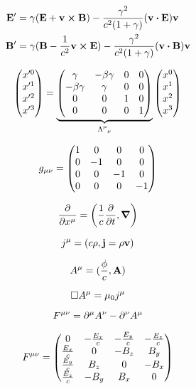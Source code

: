 \documentclass[11pt,twoside]{article}
\begin{document}
\begin{multicols}{3}
\begin{footnotesize}
\begin{equation}
\begin{split}
\vb{E'} &= \gamma(\vb{E} + \vb{v}\cross\vb{B}) - \frac{\gamma^2}{c^2(1+\gamma)}(\vb{v}\vdot\vb{E})\vb{v} \\
\vb{B'} &= \gamma(\vb{B} - \frac{1}{c^2}\vb{v}\cross\vb{E}) - \frac{\gamma^2}{c^2(1+\gamma)}(\vb{v}\vdot\vb{B})\vb{v}
\end{split}
\end{equation}

\begin{equation}
\mqty(x'^0 \\ x'^1 \\ x'^2 \\ x'^3) = \underbrace{\mqty(\gamma&-\beta\gamma&0&0 \\ -\beta\gamma&\gamma&0&0 \\ 0&0&1&0 \\ 0&0&0&1)}_{\Lambda\indices{^\mu_\nu}}\mqty(x^0 \\ x^1 \\ x^2 \\ x^3)
\end{equation}

\begin{equation}
g_{\mu\nu} = \mqty(\dmat[0]{1,-1,-1,-1})
\end{equation}

\begin{equation}
\pdv{x\indices{^\mu}} = \left(\frac{1}{c}\pdv{t}, \gradient \right)
\end{equation}

\begin{equation}
j\indices{^\mu} = (c\rho, \vb{j} = \rho \vb{v})
\end{equation}

\begin{equation}
A\indices{^\mu} = (\frac{\phi}{c}, \vb{A})
\end{equation}

\begin{equation}
\Box A\indices{^\mu} = \mu_0 j\indices{^\mu}
\end{equation}

\begin{equation}
F\indices{^{\mu\nu}} = \partial\indices{^\mu}A\indices{^\nu} - \partial\indices{^\nu}A\indices{^\mu} 
\end{equation}

\begin{equation}
F\indices{^{\mu\nu}} = \mqty(0&-\frac{E_x}{c}&-\frac{E_y}{c}&-\frac{E_z}{c} \\ \frac{E_x}{c}&0&-B_z&B_y \\ \frac{E_y}{c}&B_z&0&-B_x\\\frac{E_z}{c}&-B_y&B_x&0)
\end{equation}


\end{footnotesize}
\end{multicols}
\end{document}
